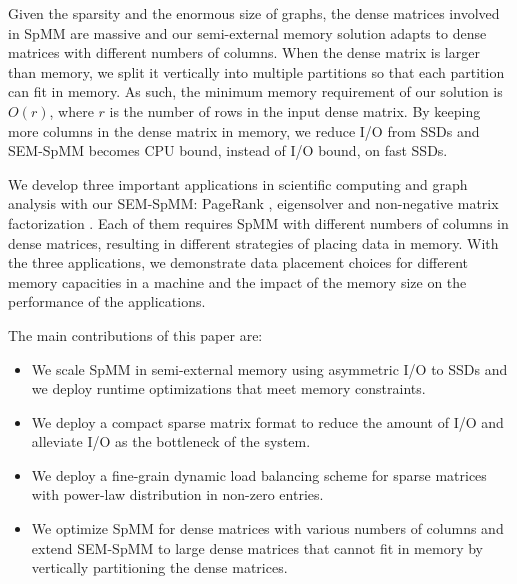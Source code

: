Given the sparsity and the enormous size of graphs, the dense matrices involved
in SpMM are massive and our semi-external memory solution adapts to
dense matrices with different numbers of columns. When the dense matrix is
larger than memory, we split it
vertically into multiple partitions so that each partition can fit in
memory. As such, the minimum memory requirement of our solution is $O(r)$,
where $r$ is the number of rows in the input dense matrix. By keeping more columns
in the dense matrix in memory, we reduce I/O from SSDs and SEM-SpMM becomes
CPU bound, instead of I/O bound, on fast SSDs.

We develop three important applications in scientific computing and graph
analysis
with our SEM-SpMM: PageRank \cite{pagerank}, eigensolver \cite{anasazi} and
non-negative matrix factorization \cite{nmf}. Each of them requires SpMM with
different numbers of columns in dense matrices, resulting in different
strategies of placing data in memory. With the three applications, we
demonstrate data placement choices for different memory capacities in a machine
and the impact of the memory size on the performance of the applications.


The main contributions of this paper are:
\begin{itemize}
	\item We scale SpMM in semi-external memory using asymmetric I/O to SSDs and we
    deploy runtime optimizations that meet memory constraints.
	\item We deploy a compact sparse matrix format to reduce the amount of
		I/O and alleviate I/O as the bottleneck of the system.
	\item We deploy a fine-grain dynamic load balancing scheme for sparse
		matrices with power-law distribution in non-zero entries.
	\item We optimize SpMM for dense matrices with various numbers of columns
		and extend SEM-SpMM to large dense matrices that cannot fit in memory
		by vertically partitioning the dense matrices.
\end{itemize}

